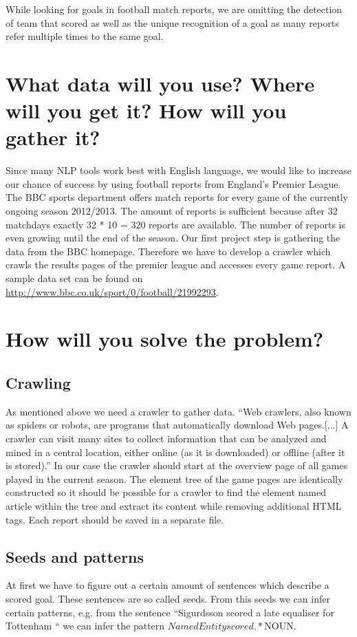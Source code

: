 \documentclass[11pt,titlepage,oneside,openany]{book}
\begin{document}
While looking for goals in football match reports, we are omitting the detection of team that scored as well as the unique recognition of a goal as many reports refer multiple times to the same goal.

\section{What data will you use? Where will you get it? How will you gather it?}

Since many NLP tools work best with English language, we would like to increase our chance of success by using football reports from England’s Premier League. The BBC sports department offers match reports for every game of the currently ongoing season 2012/2013. The amount of reports is sufficient because after 32 matchdays exactly 32 * 10 = 320 reports are available. The number of reports is even growing until the end of the season. Our first project step is gathering the data from the BBC homepage. Therefore we have to develop a crawler which crawls the results pages of the premier league and accesses every game report. A sample data set can be found on \href{http://www.bbc.co.uk/sport/0/football/21992293}{http://www.bbc.co.uk/sport/0/football/21992293}.		
			
\section{How will you solve the problem?}
\subsection{Crawling}
As mentioned above we need a crawler to gather data. “Web crawlers, also known as spiders or robots, are programs that automatically download Web pages.[...] A crawler can visit many sites to collect information that can be analyzed and mined in a central location, either online (as it is downloaded) or offline (after it is stored).” \cite[p.311]{Liu2007} In our case the crawler should start at the overview page of all games played in the current season. The element tree of the game pages are identically constructed so it should be possible for a crawler to find the element named article within the tree and extract its content while removing additional HTML tags. Each report should be saved in a separate file. 

\subsection{Seeds and patterns}
At first we have to figure out a certain amount of sentences which describe a scored goal. These sentences are so called seeds. 
From this seeds we can infer certain patterns, e.g. from the sentence “Sigurdsson scored a late equaliser for Tottenham “ we can infer the pattern $NamedEntity scored .* $NOUN. 
\end{document}
